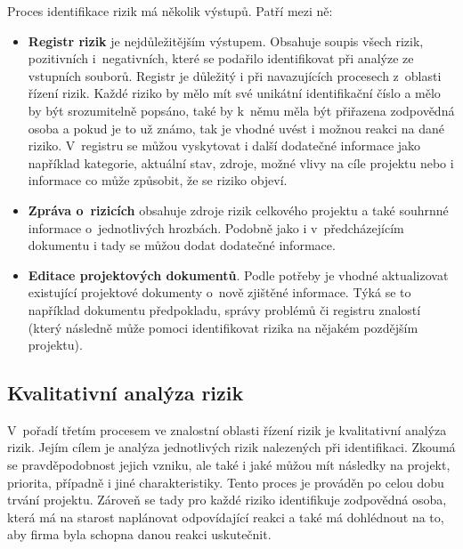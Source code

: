  Proces identifikace rizik má několik výstupů. Patří mezi ně:
 
 \begin{itemize}
     \item \textbf{Registr rizik} je nejdůležitějším výstupem. Obsahuje soupis všech rizik, pozitivních i~negativních, které se podařilo identifikovat při analýze ze vstupních souborů. Registr je důležitý i při navazujících procesech z~oblasti řízení rizik. Každé riziko by mělo mít své unikátní identifikační číslo a mělo by být srozumitelně popsáno, také by k~němu měla být přiřazena zodpovědná osoba a pokud je to už známo, tak je vhodné uvést i možnou reakci na dané riziko. V~registru se můžou vyskytovat i další dodatečné informace jako například kategorie, aktuální stav, zdroje, možné vlivy na cíle projektu nebo i informace co může způsobit, že se riziko objeví.
     \item \textbf{Zpráva o~rizicích} obsahuje zdroje rizik celkového projektu a také souhrnné informace o~jednotlivých hrozbách. Podobně jako i v~předcházejícím dokumentu i tady se můžou dodat dodatečné informace.
     \item \textbf{Editace projektových dokumentů}. Podle potřeby je vhodné aktualizovat existující projektové dokumenty o~nově zjištěné informace. Týká se to například dokumentu předpokladu, správy problémů či registru znalostí (který následně může pomoci identifikovat rizika na nějakém pozdějším projektu).
 \end{itemize}

\subsection{Kvalitativní analýza rizik}

V~pořadí třetím procesem ve znalostní oblasti řízení rizik je kvalitativní analýza rizik. Jejím cílem je analýza jednotlivých rizik nalezených při identifikaci. Zkoumá se pravděpodobnost jejich vzniku, ale také i jaké můžou mít následky na projekt, priorita, případně i jiné charakteristiky. Tento proces je prováděn po celou dobu trvání projektu. Zároveň se tady pro každé riziko identifikuje zodpovědná osoba, která má na starost naplánovat odpovídající reakci a také má dohlédnout na to, aby firma byla schopna danou reakci uskutečnit.

